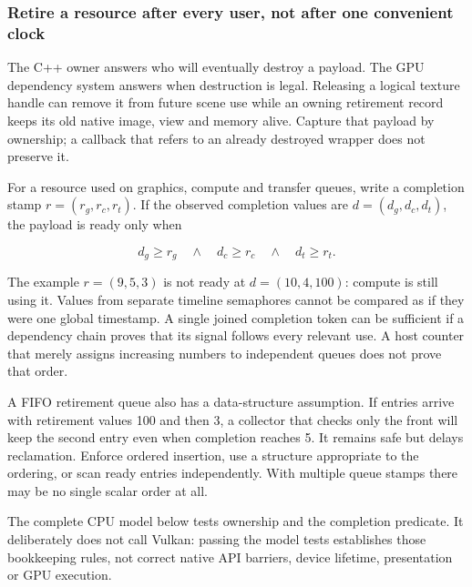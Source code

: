 \subsubsection{Retire a resource after every user, not after one convenient clock}\label{05-engine-i-ch019-retire-a-resource-after-every-user-not-after-one-convenient-clock}

\hypertarget{05-engine-i-ch019-retire-a-resource-after-every-user-not-after-one-convenient-clock}{}

The C++ owner answers who will eventually destroy a payload. The GPU dependency system answers when destruction is legal. Releasing a logical texture handle can remove it from future scene use while an owning retirement record keeps its old native image, view and memory alive. Capture that payload by ownership; a callback that refers to an already destroyed wrapper does not preserve it.

For a resource used on graphics, compute and transfer queues, write a completion stamp \(r=(r_g,r_c,r_t)\). If the observed completion values are \(d=(d_g,d_c,d_t)\), the payload is ready only when

\[
d_g\ge r_g\quad\land\quad d_c\ge r_c\quad\land\quad d_t\ge r_t.
\]

The example \(r=(9,5,3)\) is not ready at \(d=(10,4,100)\): compute is still using it. Values from separate timeline semaphores cannot be compared as if they were one global timestamp. A single joined completion token can be sufficient if a dependency chain proves that its signal follows every relevant use. A host counter that merely assigns increasing numbers to independent queues does not prove that order.

A FIFO retirement queue also has a data-structure assumption. If entries arrive with retirement values 100 and then 3, a collector that checks only the front will keep the second entry even when completion reaches 5. It remains safe but delays reclamation. Enforce ordered insertion, use a structure appropriate to the ordering, or scan ready entries independently. With multiple queue stamps there may be no single scalar order at all.

The complete CPU model below tests ownership and the completion predicate. It deliberately does not call Vulkan: passing the model tests establishes those bookkeeping rules, not correct native API barriers, device lifetime, presentation or GPU execution.

